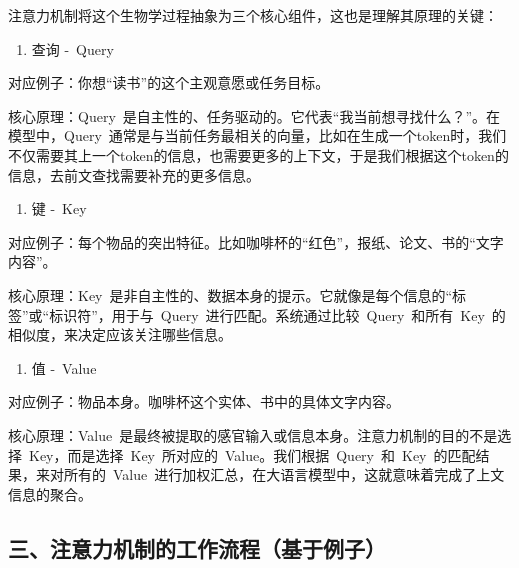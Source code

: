 注意力机制将这个生物学过程抽象为三个核心组件，这也是理解其原理的关键：

\begin{enumerate}
\def\labelenumi{\arabic{enumi}.}
\tightlist
\item
  查询 -~Query
\end{enumerate}

对应例子：你想``读书''的这个主观意愿或任务目标。

核心原理：Query~是自主性的、任务驱动的。它代表``我当前想寻找什么？''。在模型中，Query~通常是与当前任务最相关的向量，比如在生成一个token时，我们不仅需要其上一个token的信息，也需要更多的上下文，于是我们根据这个token的信息，去前文查找需要补充的更多信息。

\begin{enumerate}
\def\labelenumi{\arabic{enumi}.}
\setcounter{enumi}{1}
\tightlist
\item
  键 -~Key
\end{enumerate}

对应例子：每个物品的突出特征。比如咖啡杯的``红色''，报纸、论文、书的``文字内容''。

核心原理：Key~是非自主性的、数据本身的提示。它就像是每个信息的``标签''或``标识符''，用于与~Query~进行匹配。系统通过比较~Query~和所有~Key~的相似度，来决定应该关注哪些信息。

\begin{enumerate}
\def\labelenumi{\arabic{enumi}.}
\setcounter{enumi}{2}
\tightlist
\item
  值 -~Value
\end{enumerate}

对应例子：物品本身。咖啡杯这个实体、书中的具体文字内容。

核心原理：Value~是最终被提取的感官输入或信息本身。注意力机制的目的不是选择~Key，而是选择~Key~所对应的~Value。我们根据~Query~和~Key~的匹配结果，来对所有的~Value~进行加权汇总，在大语言模型中，这就意味着完成了上文信息的聚合。

\hypertarget{ux4e09ux6ce8ux610fux529bux673aux5236ux7684ux5de5ux4f5cux6d41ux7a0bux57faux4e8eux4f8bux5b50}{%
\subsection{三、注意力机制的工作流程（基于例子）}\label{ux4e09ux6ce8ux610fux529bux673aux5236ux7684ux5de5ux4f5cux6d41ux7a0bux57faux4e8eux4f8bux5b50}}

